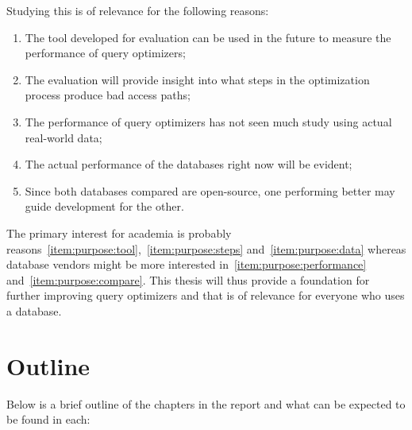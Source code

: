 Studying this is of relevance for the following reasons:
\begin{enumerate}
\item\label{item:purpose:tool} The tool developed for evaluation can be used
  in the future to measure the performance of query optimizers;
\item\label{item:purpose:steps} The evaluation will provide insight into
  what steps in the optimization process produce bad access paths;
\item\label{item:purpose:data} The performance of query optimizers has not
  seen much study using actual real-world data;
\item\label{item:purpose:performance} The actual performance of the
  databases right now will be evident;
\item\label{item:purpose:compare} Since both databases compared are
  open-source, one performing better may guide development for the other.
\end{enumerate}

The primary interest for academia is probably
reasons~\ref{item:purpose:tool},~\ref{item:purpose:steps}
and~\ref{item:purpose:data} whereas database vendors might be more interested
in~\ref{item:purpose:performance} and~\ref{item:purpose:compare}. This thesis
will thus provide a foundation for further improving query optimizers and that
is of relevance for everyone who uses a database.

\section{Outline}
Below is a brief outline of the chapters in the report and what can be expected
to be found in each:

